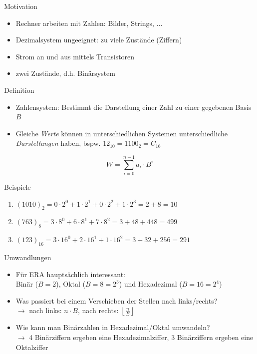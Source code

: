 \begin{frame}[c]{Motivation}{}
	\begin{itemize}
		\item Rechner arbeiten mit Zahlen: Bilder, Strings, ...
		\item Dezimalsystem ungeeignet: zu viele Zustände (Ziffern)
		\item Strom an und aus mittels Transistoren
		\item zwei Zustände, d.h. Binärsystem
	\end{itemize}
\end{frame}

\begin{frame}[c]{Definition}{}
	\begin{itemize}
		\item Zahlensystem: Bestimmt die Darstellung einer Zahl zu einer gegebenen Basis $B$
		\item Gleiche \emph{Werte} können in unterschiedlichen Systemen unterschiedliche \emph{Darstellungen} haben, bspw. $12_{10}=1100_2=C_{16}$
	\end{itemize}

	\begin{equation}
		W=\sum_{i=0}^{n-1}a_i\cdot B^i
	\end{equation}

	\hspace{1cm}

	\begin{block}{Beispiele}
		\begin{enumerate}
			\item $(1010)_2 = 0\cdot 2^0+1\cdot 2^1+0\cdot 2^2+1\cdot 2^3=2+8=10$
			\item $(763)_8 = 3\cdot 8^0+6\cdot 8^1+7\cdot 8^2=3+48+448=499$
			\item $(123)_{16} = 3\cdot 16^0+2\cdot 16^1+1\cdot 16^2=3+32+256=291$
		\end{enumerate}
	\end{block}
\end{frame}

\begin{frame}[c]{Umwandlungen}{}
	\begin{itemize}
		\item Für ERA hauptsächlich interessant:\\Binär ($B=2$), Oktal ($B=8=2^3$) und Hexadezimal ($B=16=2^4$)
		\item Was passiert bei einem Verschieben der Stellen nach links/rechts?\pause\\
		      $\rightarrow$ nach links: $n\cdot B$, nach rechts: $\left\lfloor{\frac{n}{B}}\right\rfloor$
		\item Wie kann man Binärzahlen in Hexadezimal/Oktal umwandeln?\pause\\
		      $\rightarrow$ 4 Binärziffern ergeben eine Hexadezimalziffer, 3 Binärziffern ergeben eine Oktalziffer
	\end{itemize}
\end{frame}

